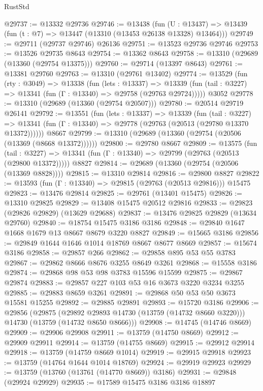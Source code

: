 \begin{lexlean}{RustStd}
\begin{coremodule}
@29737 := @13332 @29736
@29746 := @13438
    (fun (U : @13437) => @13439 (fun (t : @7) => @13447 (@13310 (@13453 @26138 @13328) @13464)))
@29749 := @29711 (@29737 @29746) @26136
@29751 := @13523 @29736 @29746
@29753 := @13526 @29735 @8643
@29754 := @13362 @8643
@29758 := @13310 (@29689 (@13360 (@29754 @13375)))
@29760 := @29714 (@13397 @8643)
@29761 := @13381 @29760
@29763 := @13310 (@29761 @13402)
@29774 := @13529
    (fun (rty : @3049) =>
    @13338
      (fun (lets : @13337) =>
      @13339 (fun (tail : @3227) => @13341 (fun (Γ : @13340) => @29758 (@29763 @29724)))))
    @3052
@29778 := @13310 (@29689 (@13360 (@29754 @20507)))
@29780 := @20514 @29719 @26141
@29792 := @13551
    (fun (lets : @13337) =>
    @13339
      (fun (tail : @3227) =>
      @13341 (fun (Γ : @13340) => @29778 (@29763 (@20513 (@29780 @13370 @13372))))))
    @8667
@29799 := @13310 (@29689 (@13360 (@29754 (@20506 (@13369 (@8668 @13372))))))
@29800 := @29780 @8667
@29809 := @13575
    (fun (tail : @3227) => @13341 (fun (Γ : @13340) => @29799 (@29763 (@20513 (@29800 @13372)))))
    @8827
@29814 := @29689 (@13360 (@29754 (@20506 (@13369 @8828))))
@29815 := @13310 @29814
@29816 := @29800 @8827
@29822 := @13593 (fun (Γ : @13340) => @29815 (@29763 (@20513 @29816))) @15475
@29823 := @13476 @29814
@29825 := @29761 (@13401 @15475)
@29826 := @13310 @29825
@29829 := @13408 @15475 @20512 @29816
@29833 := @29823 (@29826 @29829) (@13629 @29688)
@29837 := @13476 @29825 @29829 (@13634 @29760)
@29840 := @18754 @15475 @3186 @3186
@29848 := @29840 @1647 @1668 @1679 @13 @8667 @8679 @3220 @8827
@29849 := @15665 @3186
@29856 := @29849 @1644 @1646 @1014 @18769 @8667 @8677 @8669
@29857 := @15674 @3186
@29858 := @29857 @266
@29862 := @29858 @895 @53 @55 @3783
@29867 := @29862 @8666 @8676 @3255 @8649 @3261
@29868 := @15558 @3186
@29874 := @29868 @98 @53 @98 @3783 @15596 @15599
@29875 := @29867 @29874
@29883 := @29857 @227 @103 @53 @16 @3673 @3220 @3234 @3255
@29885 := @29883 @8659 @3261
@29891 := @29868 @50 @53 @50 @3673 @15581 @15255
@29892 := @29885 @29891
@29893 := @15720 @3186
@29906 := @29856
    (@29875
      (@29892 @29893 @14730 (@13759 (@14732 @8660 @3220)))
      @14730
      (@13759 (@14732 @8650 @8666)))
@29908 := @14745 (@14746 @8669)
@29909 := @29906 @29908
@29911 := @13759 (@14750 @8669)
@29912 := @29909 @29911
@29914 := @13759 (@14755 @8669)
@29915 := @29912 @29914
@29918 := @13759 (@14759 @8669 @1014)
@29919 := @29915 @29918
@29923 := @13759 (@14764 @1644 @1014 @18769)
@29924 := @29919 @29923
@29929 := @13759 (@13760 (@13761 (@14770 @8669)) @3186)
@29931 := @29848 (@29924 @29929)
@29935 := @17589 @15475 @3186 @3186 @18897

\end{coremodule}
\end{lexlean}
